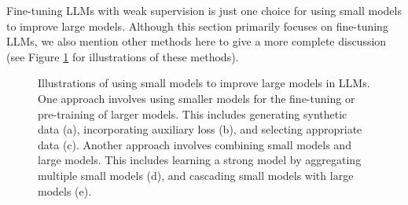 Fine-tuning LLMs with weak supervision is just one choice for using small models to improve large models. Although this section primarily focuses on fine-tuning LLMs, we also mention other methods here to give a more complete discussion (see Figure \ref{fig:small-to-large-improvement} for illustrations of these methods).

\begin{figure}[!t]
\centering

\caption{Illustrations of using small models to improve large models in LLMs. One approach involves using smaller models for the fine-tuning or pre-training of larger models. This includes generating synthetic data (a), incorporating auxiliary loss (b), and selecting appropriate data (c). Another approach involves combining small models and large models. This includes learning a strong model by aggregating multiple small models (d), and cascading small models with large models (e).}
\label{fig:small-to-large-improvement}
\end{figure}

